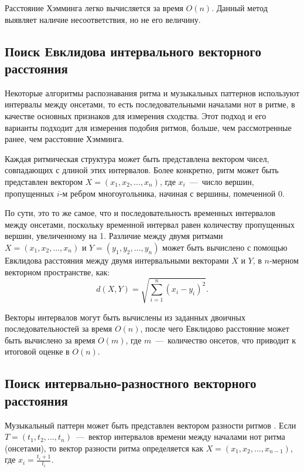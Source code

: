 Расстояние Хэмминга легко вычисляется за время $O(n)$. Данный метод выявляет наличие несоответствия, но не его величину.

\subsection{Поиск Евклидова интервального векторного расстояния}

Некоторые алгоритмы распознавания ритма и музыкальных паттернов используют интервалы между онсетами, то есть последовательными началами нот в ритме, в качестве основных признаков для измерения сходства. Этот подход и его варианты подходит для измерения подобия ритмов, больше, чем рассмотренные ранее, чем расстояние Хэмминга. 

Каждая ритмическая структура может быть представлена вектором чисел, совпадающих с длиной этих интервалов. Более конкретно, ритм может быть представлен вектором $X = (x_1, x_2, ..., x_n)$, где $x_i$~---~число вершин, пропущенных $i$-м ребром многоугольника, начиная с вершины, помеченной 0. 

По сути, это то же самое, что и последовательность временных интервалов между онсетами, поскольку временной интервал равен количеству пропущенных вершин, увеличенному на 1. Различие между двумя ритмами $X = (x_1, x_2, ..., x_n)$ и $Y = (y_1, y_2, ..., y_n)$ может быть вычислено с помощью Евклидова расстояния между двумя интервальными векторами $X$ и $Y$, в $n$-мерном векторном пространстве, как:
\begin{equation}
	d(X,Y) = \sqrt{\sum_{i = 1}^{n} (x_i - y_i)^2}.
\end{equation}

Векторы интервалов могут быть вычислены из заданных двоичных последовательностей за время $O(n)$, после чего Евклидово расстояние может быть вычислено за время $O(m)$, где $m$~---~количество онсетов, что приводит к итоговой оценке в $O(n)$.

\subsection{Поиск интервально-разностного векторного расстояния}

Музыкальный паттерн может быть представлен вектором разности ритмов \cite{bib11}. Если $T = (t_1, t_2,...,t_n)$~---~вектор интервалов времени между началами нот ритма (онсетами), то вектор разности ритма определяется как $X = (x_1, x_2,... , x_{n-1})$, где $x_i = \frac{t_i+1}{t_i}$. 

